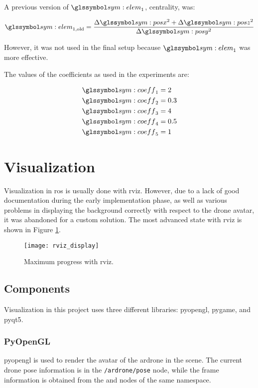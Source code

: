       A previous version of $\sym{elem}_1$, centrality, was:

      \begin{equation}
	\sym{elem}_{1,\mathrm{old}} = \frac{\Delta\sym{posx}^2 + \Delta\sym{posz}^2}{\Delta\sym{posy}^2}
      \end{equation}

      However, it was not used in the final setup because $\sym{elem}_1$ was more effective.  %

      The values of the coefficients as used in the experiments are:

      \begin{align*}
	\sym{coeff}_1 &= 2 \\
	\sym{coeff}_2 &= 0.3 \\
	\sym{coeff}_3 &= 4 \\
	\sym{coeff}_4 &= 0.5 \\
	\sym{coeff}_5 &= 1
      \end{align*}


\section{Visualization}
  Visualization in \gls{ros} is usually done with \gls{rviz}.
  However, due to a lack of good documentation during the early implementation phase, as well as various problems in displaying the background correctly with respect to the drone avatar, it was abandoned for a custom solution.
  The most advanced state with \gls{rviz} is shown in Figure \ref{fig:rviz_display}.

  \begin{figure}[h]
    \centering
    \texttt{[image: rviz\_display]}
    \caption[rviz maximum progress]{Maximum progress with \gls{rviz}.}
    \label{fig:rviz_display}
  \end{figure}

  \subsection{Components}
    Visualization in this project uses three different libraries: \gls{pyopengl}, \gls{pygame}, and \gls{pyqt5}.

    \subsubsection{PyOpenGL}
    \gls{pyopengl} is used to render the avatar of the \gls{ardrone} in the scene.
    The current drone pose information is in the \texttt{/ardrone/pose} node, while the frame information is obtained from the \texttt{} and \texttt{} nodes of the same namespace.

